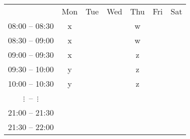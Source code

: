 \begin{tabular}{|c||c|c|c|c|c|c|}
  \hline & Mon & Tue & Wed & Thu & Fri & Sat \\
  \hhline{|=#=|=|=|=|=|=|}
  08:00 -- 08:30 & x & & & w & & \\\hline
  08:30 -- 09:00 & x & & & w & & \\\hline
  09:00 -- 09:30 & x & & & z & & \\\hline
  09:30 -- 10:00 & y & & & z & & \\\hline
  10:00 -- 10:30 & y & & & z & & \\\hline
  $\vdots$\quad~--~\quad$\vdots$ & & & & & & \\\hline
  21:00 -- 21:30 &   & & & & & \\\hline
  21:30 -- 22:00 &   & & & & & \\\hline
\end{tabular}
